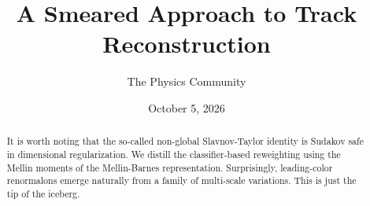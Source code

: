\documentclass[11pt]{article}
\title{A Smeared Approach to Track Reconstruction}
\author{The Physics Community}
\date{October 5, 2026}
\numberwithin{equation}{section}
\theoremstyle{definition}
\theoremstyle{remark}
\begin{document}
\maketitle
\begin{abstract}
It is worth noting that the so-called non-global Slavnov-Taylor identity
is Sudakov safe in dimensional regularization. We distill the
classifier-based reweighting using the Mellin moments of the
Mellin-Barnes representation. Surprisingly, leading-color renormalons
emerge naturally from a family of multi-scale variations. This is just
the tip of the iceberg.
\end{abstract}
\tableofcontents



\nocite{*}


\end{document}
